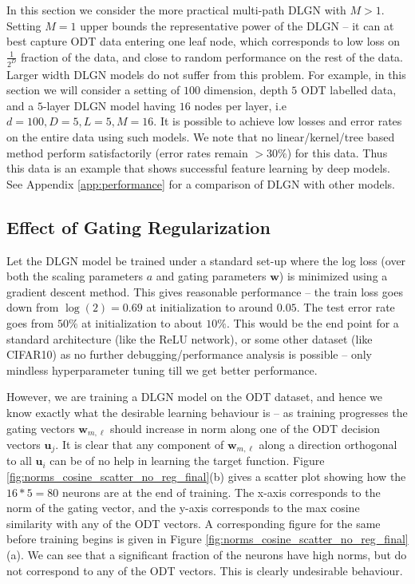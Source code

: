 \documentclass{article}
\theoremstyle{plain}
\theoremstyle{definition}
\theoremstyle{remark}
\newcommand{\1}{{\mathbf 1}}
\newcommand{\0}{{\mathbf 0}}
\newcommand{\w}{{\mathbf w}}
\newcommand{\bu}{{\mathbf u}}
\renewcommand{\>}{{\rightarrow}}
\begin{document}
In this section we consider the more practical multi-path DLGN with $M>1$. Setting $M=1$ upper bounds the representative power of the DLGN -- it can at best capture ODT data entering one leaf node, which corresponds to low loss on $\frac{1}{2^D}$ fraction of the data, and close to random performance on the rest of the data. Larger width DLGN models do not suffer from this problem.  For example, in this section we will consider a setting of $100$ dimension, depth $5$ ODT labelled data, and a $5$-layer DLGN model having $16$ nodes per layer, i.e $d=100, D=5, L=5, M=16$. It is possible to achieve low losses and error rates on the entire data using such models. We note that no linear/kernel/tree based method perform satisfactorily (error rates remain $> 30\%$) for this data. Thus this data is an example that shows successful feature learning by deep models. See Appendix \ref{app:performance} for a comparison of DLGN with other models.

\subsection{Effect of Gating Regularization}
\label{sec:gating_regularization}

Let the DLGN model be trained under a standard set-up where the log loss (over both the scaling parameters $a$ and gating parameters $\w$) is minimized using a gradient descent method. This gives reasonable performance -- the train loss goes down from $\log(2)=0.69$ at initialization to around $0.05$. The test error rate goes from $50\%$ at initialization to about $10\%$. This would be the end point for a standard architecture (like the ReLU network), or some other dataset (like CIFAR10) as no further debugging/performance analysis is possible -- only mindless hyperparameter tuning till we get better performance.  


However, we are training a DLGN model on the ODT dataset, and hence we know exactly what the desirable learning behaviour is -- as training progresses the gating vectors $\w_{m,\ell}$ should increase in norm along one of the ODT decision vectors $\bu_j$. It is clear that any component of $\w_{m,\ell}$ along a direction orthogonal to all $\bu_i$ can be of no help in learning the target function. Figure \ref{fig:norms_cosine_scatter_no_reg_final}(b) gives a scatter plot showing how the $16*5=80$ neurons are at the end of training. The x-axis corresponds to the norm of the gating vector, and the y-axis corresponds to the max cosine similarity  with any of the ODT vectors. A corresponding figure for the same before training begins is given in Figure \ref{fig:norms_cosine_scatter_no_reg_final}(a). We can see that a significant fraction of the neurons have high norms, but do not correspond to any of the ODT vectors. This is clearly undesirable behaviour. 
\end{document}
